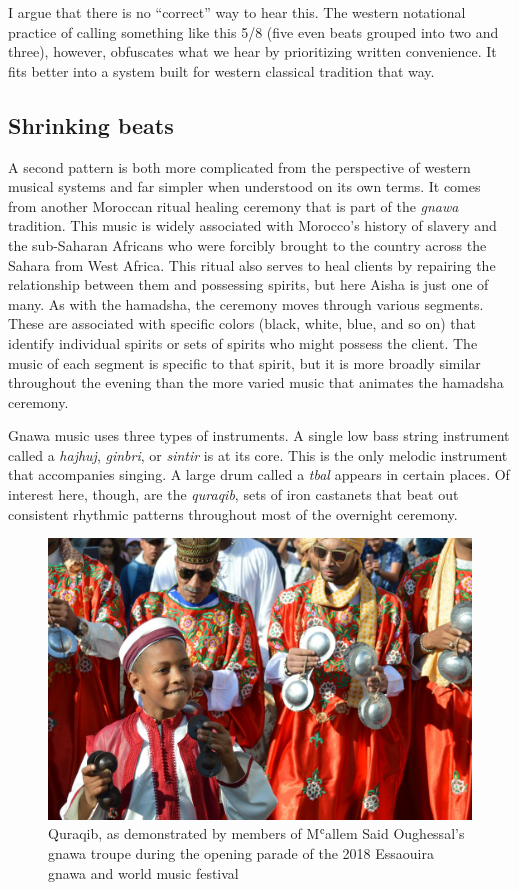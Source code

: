 \documentclass[twoside]{article}
\begin{document}
I argue that there is no ``correct'' way to hear this. The western
notational practice of calling something like this 5/8 (five even beats
grouped into two and three), however, obfuscates what we hear by
prioritizing written convenience. It fits better into a system built for
western classical tradition that way.

\hypertarget{shrinking-beats}{%
\subsection*{Shrinking beats}\label{shrinking-beats}}

A second pattern is both more complicated from the perspective of
western musical systems and far simpler when understood on its own
terms. It comes from another Moroccan ritual healing ceremony that is
part of the \emph{gnawa} tradition. This music is widely associated with
Morocco's history of slavery and the sub-Saharan Africans who were
forcibly brought to the country across the Sahara from West Africa. This
ritual also serves to heal clients by repairing the relationship between
them and possessing spirits, but here Aisha is just one of many. As with
the hamadsha, the ceremony moves through various segments. These are
associated with specific colors (black, white, blue, and so on) that
identify individual spirits or sets of spirits who might possess the
client. The music of each segment is specific to that spirit, but it is
more broadly similar throughout the evening than the more varied music
that animates the hamadsha ceremony.

Gnawa music uses three types of instruments. A single low bass string
instrument called a \emph{hajhuj}, \emph{ginbri}, or \emph{sintir} is at
its core. This is the only melodic instrument that accompanies singing.
A large drum called a \emph{tbal} appears in certain places. Of interest
here, though, are the \emph{quraqib}, sets of iron castanets that beat
out consistent rhythmic patterns throughout most of the overnight
ceremony.

\begin{figure}
\centering
\includegraphics[width=\textwidth]{../../chapters/witulski-2021/images/gnawa.jpg}
\caption{Quraqib, as demonstrated by members of Mʿallem Said Oughessal's
gnawa troupe during the opening parade of the 2018 Essaouira gnawa and
world music festival}
\end{figure}
\end{document}
